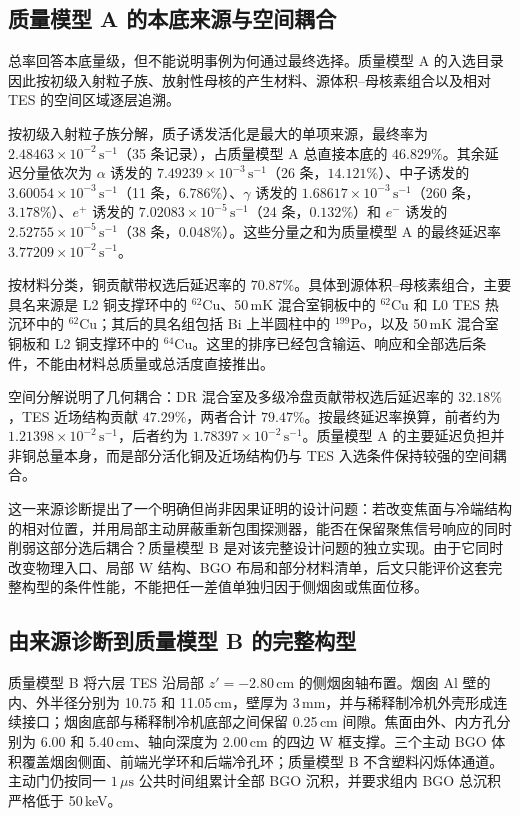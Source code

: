 \documentclass[11pt]{article}
\newcommand{\cps}{\,\mathrm{s^{-1}}}
\begin{document}
\subsection{质量模型 A 的本底来源与空间耦合}
\label{subsec:mass_model_a_origins_zh}

总率回答本底量级，但不能说明事例为何通过最终选择。质量模型 A 的入选目录因此按初级入射粒子族、放射性母核的产生材料、源体积--母核素组合以及相对 TES 的空间区域逐层追溯。

按初级入射粒子族分解，质子诱发活化是最大的单项来源，最终率为 $2.48463\times10^{-2}\cps$（35 条记录），占质量模型 A 总直接本底的 $46.829\%$。其余延迟分量依次为 $\alpha$ 诱发的 $7.49239\times10^{-3}\cps$（26 条，$14.121\%$）、中子诱发的 $3.60054\times10^{-3}\cps$（11 条，$6.786\%$）、$\gamma$ 诱发的 $1.68617\times10^{-3}\cps$（260 条，$3.178\%$）、$e^+$ 诱发的 $7.02083\times10^{-5}\cps$（24 条，$0.132\%$）和 $e^-$ 诱发的 $2.52755\times10^{-5}\cps$（38 条，$0.048\%$）。这些分量之和为质量模型 A 的最终延迟率 $3.77209\times10^{-2}\cps$。

按材料分类，铜贡献带权选后延迟率的 $70.87\%$。具体到源体积--母核素组合，主要具名来源是 L2 铜支撑环中的 $^{62}$Cu、50\,mK 混合室铜板中的 $^{62}$Cu 和 L0 TES 热沉环中的 $^{62}$Cu；其后的具名组包括 Bi 上半圆柱中的 $^{199}$Po，以及 50\,mK 混合室铜板和 L2 铜支撑环中的 $^{64}$Cu。这里的排序已经包含输运、响应和全部选后条件，不能由材料总质量或总活度直接推出。

空间分解说明了几何耦合：DR 混合室及多级冷盘贡献带权选后延迟率的 $32.18\%$，TES 近场结构贡献 $47.29\%$，两者合计 $79.47\%$。按最终延迟率换算，前者约为 $1.21398\times10^{-2}\cps$，后者约为 $1.78397\times10^{-2}\cps$。质量模型 A 的主要延迟负担并非铜总量本身，而是部分活化铜及近场结构仍与 TES 入选条件保持较强的空间耦合。

这一来源诊断提出了一个明确但尚非因果证明的设计问题：若改变焦面与冷端结构的相对位置，并用局部主动屏蔽重新包围探测器，能否在保留聚焦信号响应的同时削弱这部分选后耦合？质量模型 B 是对该完整设计问题的独立实现。由于它同时改变物理入口、局部 W 结构、BGO 布局和部分材料清单，后文只能评价这套完整构型的条件性能，不能把任一差值单独归因于侧烟囱或焦面位移。

\FloatBarrier

\subsection{由来源诊断到质量模型 B 的完整构型}
\label{subsec:optimized_shield_results_zh}

质量模型 B 将六层 TES 沿局部 $z'=-2.80$\,cm 的侧烟囱轴布置。烟囱 Al 壁的内、外半径分别为 10.75 和 11.05\,cm，壁厚为 3\,mm，并与稀释制冷机外壳形成连续接口；烟囱底部与稀释制冷机底部之间保留 0.25\,cm 间隙。焦面由外、内方孔分别为 6.00 和 5.40\,cm、轴向深度为 2.00\,cm 的四边 W 框支撑。三个主动 BGO 体积覆盖烟囱侧面、前端光学环和后端冷孔环；质量模型 B 不含塑料闪烁体通道。主动门仍按同一 $1\,\mu\mathrm{s}$ 公共时间组累计全部 BGO 沉积，并要求组内 BGO 总沉积严格低于 50\,keV。
\end{document}
